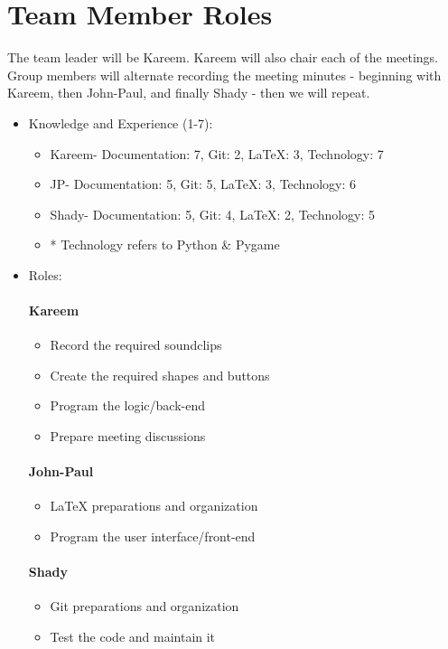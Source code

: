 \documentclass{article}
\begin{document}
\section{Team Member Roles}
The team leader will be Kareem. Kareem will also chair each of the meetings. Group members will alternate recording the meeting minutes - beginning with Kareem, then John-Paul, and finally Shady - then we will repeat.
\\
\begin{itemize}
\item Knowledge and Experience (1-7):
\begin{itemize}
\item Kareem- Documentation: 7, Git: 2, LaTeX: 3, Technology: 7
\item  JP- Documentation: 5, Git: 5, LaTeX: 3, Technology: 6
\item Shady- Documentation: 5, Git: 4, LaTeX: 2, Technology: 5
\item * Technology refers to Python \& Pygame
\end{itemize}
\item Roles: 
\paragraph{Kareem}
\begin{itemize}
\item Record the required soundclips
\item Create the required shapes and buttons
\item Program the logic/back-end
\item Prepare meeting discussions
\end{itemize}
\paragraph{John-Paul}
\begin{itemize}
\item LaTeX preparations and organization
\item Program the user interface/front-end
\end{itemize}
\paragraph{Shady}
\begin{itemize}
\item Git preparations and organization
\item Test the code and maintain it
\end{itemize}
\end{itemize}
\end{document}
